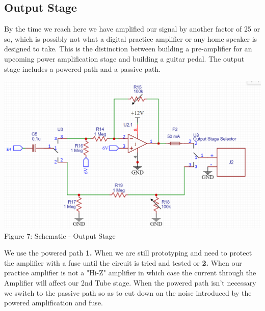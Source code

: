 \documentclass[11pt]{article}
\newcommand{\tab}{\hspace*{6mm}}
\begin{document}
\subsection{Output Stage}
\tab By the time we reach here we have amplified our signal by another factor of 25 or so, which is possibly not what a digital practice amplifier or any home speaker is designed to take. This is the distinction between building a pre-amplifier for an upcoming power amplification stage and building a guitar pedal. The output stage includes a powered path and a passive path. 
\begin{center}\includegraphics[width=\textwidth]{Documentation LaTeX/sch_output.png}\\\small{Figure 7: Schematic - Output Stage}\end{center}
\tab We use the powered path \textbf{1.} When we are still prototyping and need to protect the amplifier with a fuse until the circuit is tried and tested or \textbf{2.} When our practice amplifier is not a "Hi-Z" amplifier in which case the current through the Amplifier will affect our 2nd Tube stage. When the powered path isn't necessary we switch to the passive path so as to cut down on the noise introduced by the powered amplification and fuse. 
\newpage
\end{document}
